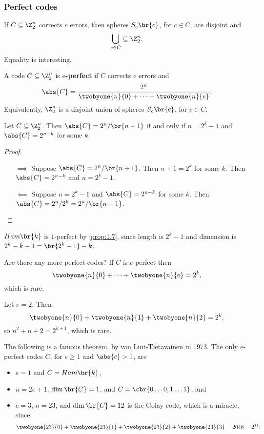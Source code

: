 \pagebreak

\subsubsection{Perfect codes}

If $ C \subseteq \Z_2^n $ corrects $ e $ errors, then spheres $ S_e\br{c} $, for $ c \in C $, are disjoint and
$$ \bigcup_{c \in C} \subseteq \Z_2^n. $$
Equality is interesting.

\begin{definition*}
A code $ C \subseteq \Z_2^n $ is \textbf{$ e $-perfect} if $ C $ corrects $ e $ errors and
$$ \abs{C} = \dfrac{2^n}{\twobyone{n}{0} + \dots + \twobyone{n}{e}}. $$
Equivalently, $ \Z_2^n $ is a disjoint union of spheres $ S_e\br{c} $, for $ c \in C $.
\end{definition*}

\begin{proposition}
Let $ C \subseteq \Z_2^n $. Then $ \abs{C} = 2^n / \br{n + 1} $ if and only if $ n = 2^k - 1 $ and $ \abs{C} = 2^{n - k} $ for some $ k $.
\end{proposition}

\begin{proof}
\hfill
\begin{itemize}
\item[$ \implies $] Suppose $ \abs{C} = 2^n / \br{n + 1} $. Then $ n + 1 = 2^k $ for some $ k $. Then $ \abs{C} = 2^{n - k} $ and $ n = 2^k - 1 $.
\item[$ \impliedby $] Suppose $ n = 2^k - 1 $ and $ \abs{C} = 2^{n - k} $ for some $ k $. Then $ \abs{C} = 2^n / 2^k = 2^n / \br{n + 1} $.
\end{itemize}
\end{proof}

\begin{example*}
$ Ham\br{k} $ is $ 1 $-perfect by \ref{prop:1.7}, since length is $ 2^k - 1 $ and dimension is $ 2^k - k - 1 = \br{2^k - 1} - k $.
\end{example*}

Are there any more perfect codes? If $ C $ is $ e $-perfect then
$$ \twobyone{n}{0} + \dots + \twobyone{n}{e} = 2^k, $$
which is rare.

\begin{example*}
Let $ e = 2 $. Then
$$ \twobyone{n}{0} + \twobyone{n}{1} + \twobyone{n}{2} = 2^k, $$
so $ n^2 + n + 2 = 2^{k + 1} $, which is rare.
\end{example*}

The following is a famous theorem, by van Lint-Tietavainen in 1973. The only $ e $-perfect codes $ C $, for $ e \ge 1 $ and $ \abs{c} > 1 $, are
\begin{itemize}
\item $ e = 1 $ and $ C = Ham\br{k} $,
\item $ n = 2e + 1 $, $ \dim\br{C} = 1 $, and $ C = \cbr{0 \dots 0, 1 \dots 1} $, and
\item $ e = 3 $, $ n = 23 $, and $ \dim\br{C} = 12 $ is the Golay code, which is a miracle, since
$$ \twobyone{23}{0} + \twobyone{23}{1} + \twobyone{23}{2} + \twobyone{23}{3} = 2048 = 2^{11}. $$
\end{itemize}

